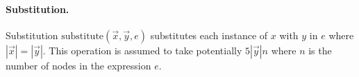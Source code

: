\paragraph{Substitution.}  Substitution $\mbox{substitute}(\overrightarrow{x},\overrightarrow{y}, e)$ substitutes each instance of $x$ with $y$ in $e$ where $|\overrightarrow{x}| = |\overrightarrow{y}|$. This operation is assumed to take potentially $5 |\overrightarrow{y}| n$ where $n$ is the number of nodes in the expression $e$.




